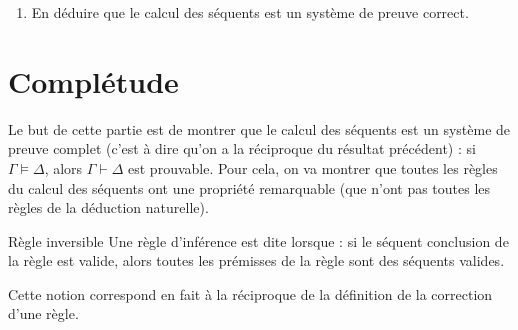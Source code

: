 \documentclass[a4paper,french,bookmarks]{article}
\begin{document}
\begin{enumerate}
        \item En déduire que le calcul des séquents est un système de preuve correct.
        
    \end{enumerate}
    
    \section{Complétude}
    
    Le but de cette partie est de montrer que le calcul des séquents est un système de preuve complet (c'est à dire qu'on a la réciproque du résultat précédent) : si $\Gamma \vDash \Delta$, alors $\Gamma \vdash \Delta$ est prouvable. Pour cela, on va montrer que toutes les règles du calcul des séquents ont une propriété remarquable (que n'ont pas toutes les règles de la déduction naturelle).
    
    \begin{definition*}{Règle inversible}{}
        Une règle d'inférence est dite  lorsque : si le séquent conclusion de la règle est valide, alors toutes les prémisses de la règle sont des séquents valides.
    \end{definition*}
    
    Cette notion correspond en fait à la réciproque de la définition de la correction d'une règle.
    
\end{document}

